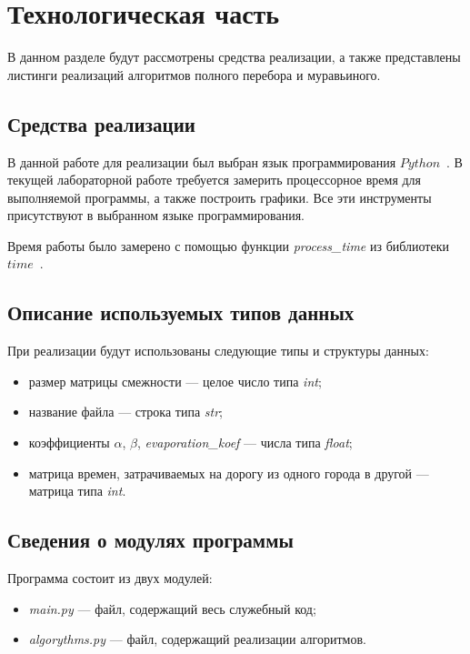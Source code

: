 \chapter{Технологическая часть}

В данном разделе будут рассмотрены средства реализации, а также представлены листинги реализаций алгоритмов полного перебора и муравьиного.

\section{Средства реализации}

В данной работе для реализации был выбран язык программирования $Python$~\cite{python-lang}. В текущей лабораторной работе требуется замерить процессорное время для выполняемой программы, а также построить графики. Все эти инструменты присутствуют в выбранном языке программирования.

Время работы было замерено с помощью функции \textit{process\_time} из библиотеки $time$~\cite{python-lang-time}.

\section{Описание используемых типов данных}

При реализации будут использованы следующие типы и структуры данных:
\begin{itemize}[label=---]
	\item размер матрицы смежности --- целое число типа \textit{int};
	\item название файла --- строка типа \textit{str};
	\item коэффициенты $\alpha$, $\beta$, \textit{evaporation\_koef} --- числа типа \textit{float};
	\item матрица времен, затрачиваемых на дорогу из одного города в другой --- матрица типа \textit{int}.
\end{itemize}

\section{Сведения о модулях программы}

Программа состоит из двух модулей:
\begin{itemize}[label={---}]
	\item \textit{main.py} --- файл, содержащий весь служебный код;
	\item \textit{algorythms.py} --- файл, содержащий реализации алгоритмов.
\end{itemize}

